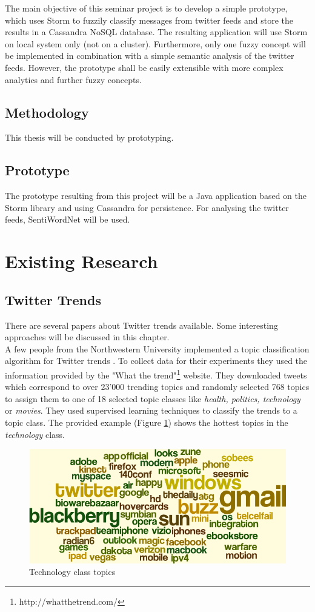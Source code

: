 \documentclass[a4paper]{article}
\begin{document}
The main objective of this seminar project is to develop a simple prototype, which uses Storm to fuzzily classify messages from twitter feeds and store the results in a Cassandra NoSQL database.
The resulting application will use Storm on local system only (not on a cluster). Furthermore, only one fuzzy concept will be implemented in combination with a simple semantic analysis of the twitter feeds. However, the prototype shall be easily extensible with more complex analytics and further fuzzy concepts.


\subsection{Methodology}
This thesis will be conducted by prototyping. 
\subsection{Prototype}
The prototype resulting from this project will be a Java application based on the Storm library and using Cassandra for persistence. For analysing the twitter feeds, SentiWordNet will be used. 

\section{Existing Research}
\subsection{Twitter Trends}
There are several papers about Twitter trends available. Some interesting approaches will be discussed in this chapter.\\

A few people from the Northwestern University implemented a topic classification algorithm for Twitter trends \cite{leeEtAl2011}. To collect data for their experiments they used the information provided by the "What the trend"\footnote{http://whatthetrend.com/} website. They downloaded tweets which correspond to over 23'000 trending topics and randomly selected 768 topics to assign them to one of 18 selected topic classes like \textit{health, politics, technology} or \textit{movies}. They used supervised learning techniques to classify the trends to a topic class. The provided example (Figure \ref{techClass}) shows the hottest topics in the \textit{technology} class.
\begin{figure}[h!]
	\centering
	\includegraphics[scale=0.35]{images/technologyClass.png}
	\caption{Technology class topics}
	\label{techClass}
\end{figure}
\end{document}
